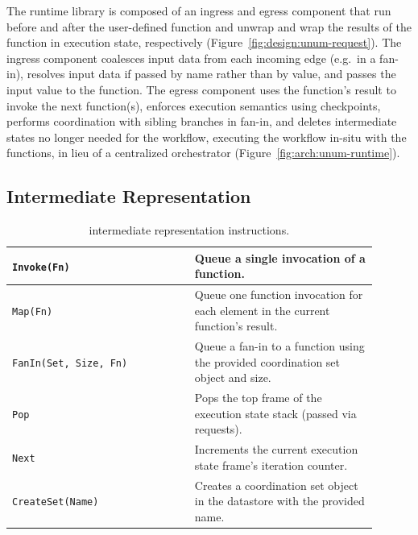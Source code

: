 
The runtime library is composed of an ingress and egress component that run
before and after the user-defined function and unwrap and wrap the results of
the function in \name{} execution state, respectively
(Figure~\ref{fig:design:unum-request}). The ingress component coalesces input
data from each incoming edge (e.g.\ in a fan-in), resolves input data if passed
by name rather than by value, and passes the input value to the function. The
egress component uses the function's result to invoke the next function(s),
enforces execution semantics using checkpoints, performs coordination with
sibling branches in fan-in, and deletes intermediate states no longer needed for
the workflow, executing the workflow in-situ with the functions, in lieu of a
centralized orchestrator (Figure~\ref{fig:arch:unum-runtime}).



\subsection{\name{} Intermediate Representation}\label{sec:design:ir}

\begin{table}[t]
  \centering
  \begin{tabular}{|m{0.45\linewidth}|m{0.45\linewidth}|}
    \hline
  \texttt{Invoke(Fn)} & Queue a single invocation of a function.\\
    \hline
  \texttt{Map(Fn)} & Queue one function invocation for each element in the current function's result.\\
    \hline
  \texttt{FanIn(Set, Size, Fn)} & Queue a fan-in to a function using the provided coordination set object and size.\\
    \hline
  \texttt{Pop} & Pops the top frame of the execution state stack (passed via \name{} requests). \\
    \hline
  \texttt{Next} & Increments the current execution state frame's iteration counter.\\
    \hline
  \texttt{CreateSet(Name)} & Creates a coordination set object in the datastore with the provided name.\\
    \hline
  \end{tabular}
  \caption{\name{} intermediate representation instructions.}
  \label{table:design:irschema}
\end{table}

